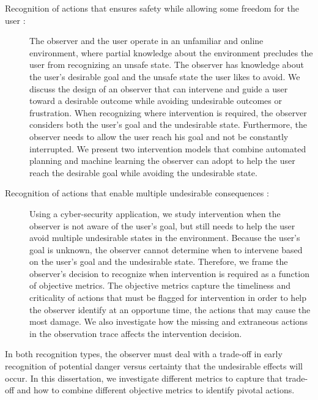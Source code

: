 \begin{description}
\item [Recognition of actions that ensures safety while allowing some freedom for the user : ] The observer and the user operate in an unfamiliar and online environment, where partial knowledge about the environment precludes the user from recognizing an unsafe state. 
The observer has knowledge about the user's desirable goal and the unsafe state the user likes to avoid.
We discuss the design of an observer that can intervene and guide a user toward a desirable outcome while avoiding undesirable outcomes or frustration.
When recognizing where intervention is required, the observer considers both the user's goal and the undesirable state.
Furthermore, the observer needs to allow the user reach his goal and not be constantly interrupted.
We present two intervention models that combine automated planning and machine learning the observer can adopt to help the user reach the desirable goal while avoiding the undesirable state.
\item [Recognition of actions that enable multiple undesirable consequences : ] Using a cyber-security application, we study intervention when the observer is not aware of the user's goal, but still needs to help the user avoid multiple undesirable states in the environment. 
Because the user's goal is unknown, the observer cannot determine when to intervene based on the user's goal and the undesirable state. Therefore, we frame the observer's decision to recognize when intervention is required as a function of objective metrics. The objective metrics capture the timeliness and criticality of actions that must be flagged for intervention in order to help the observer identify at an opportune time, the actions that may cause the most damage. 
We also investigate how the missing and extraneous actions in the observation trace affects the intervention decision.
\end{description}
In both recognition types, the observer must deal with a trade-off in early recognition of potential danger versus certainty that the undesirable effects will occur. 
In this dissertation, we investigate different metrics to capture that trade-off and how to combine different objective metrics to identify pivotal actions.

